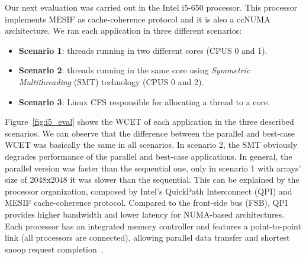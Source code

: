 \documentclass[conference]{IEEEtran}
\begin{document}
Our next evaluation was carried out in the Intel i5-650 processor. This processor implements MESIF as cache-coherence protocol and it is also a ccNUMA architecture. We ran each application in three different scenarios:

\begin{itemize}
	\item \textbf{Scenario 1}: threads running in two different cores (CPUS 0 and 1).
	\item \textbf{Scenario 2}: threads running in the same core using \textit{Symmetric Multithreading} (SMT) technology (CPUS 0 and 2).
	\item \textbf{Scenario 3}: Linux CFS responsible for allocating a thread to a core.
\end{itemize}

Figure~\ref{fig:i5_eval} shows the WCET of each application in the three described scenarios. We can observe that the difference between the parallel and best-case WCET was basically the same in all scenarios. In scenario 2, the SMT obviously degrades performance of the parallel and best-case applications. In general, the parallel version was faster than the sequential one, only in scenario 1 with arrays' size of 2048x2048 it was slower than the sequential. This can be explained by the processor organization, composed by Intel's QuickPath Interconnect (QPI) and MESIF cache-coherence protocol. Compared to the front-side bus (FSB), QPI provides higher bandwidth and lower latency for NUMA-based architectures. Each processor has an integrated memory controller and features a point-to-point link (all processors are connected), allowing parallel data transfer and shortest snoop request completion~\cite{intel}. 
\end{document}
